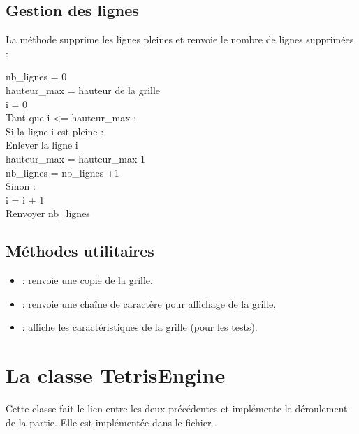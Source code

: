 \subsection{Gestion des lignes}
La méthode  supprime les lignes pleines et renvoie le nombre de lignes supprimées :
\begin{python}
	nb\_lignes = 0\\
	hauteur\_max = hauteur de la grille\\
	i = 0\\
	Tant que i <= hauteur\_max :\\
	Si la ligne i est pleine :\\
	Enlever la ligne i\\
	hauteur\_max = hauteur\_max-1\\
	nb\_lignes = nb\_lignes +1\\
	Sinon :\\
	i = i + 1\\
	Renvoyer nb\_lignes
\end{python}

\subsection{Méthodes utilitaires}
\begin{itemize}
	\item {} : renvoie une copie de la grille.
	\item {} : renvoie une chaîne de caractère pour affichage de la grille.
	\item {} : affiche les caractéristiques de la grille (pour les tests).
\end{itemize}

\section{La classe TetrisEngine}

Cette classe fait le lien entre les deux précédentes et implémente le déroulement de la partie. Elle est implémentée dans le fichier .

